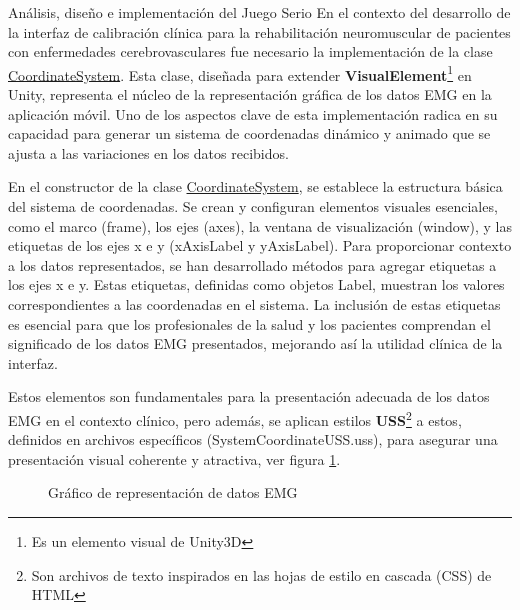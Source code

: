 \begin{thesischapter}{2} {Análisis, diseño e implementación del Juego Serio}
    En el contexto del desarrollo de la interfaz de calibración clínica para la rehabilitación neuromuscular de pacientes con enfermedades cerebrovasculares
    fue necesario la implementación de la clase \underline{CoordinateSystem}. Esta clase, diseñada para extender \textbf{VisualElement}\footnote{Es un elemento visual de Unity3D } en Unity, representa el núcleo de la representación 
    gráfica de los datos EMG en la aplicación móvil. Uno de los aspectos clave de esta implementación 
    radica en su capacidad para generar un sistema de coordenadas dinámico y animado que se ajusta a las variaciones en los datos recibidos.

    \vspace{10pt}
    En el constructor de la clase \underline{CoordinateSystem}, se establece la estructura básica del sistema de coordenadas. Se crean y configuran elementos visuales esenciales, como el 
    marco (frame), los ejes (axes), la ventana de visualización (window), y las etiquetas de los ejes x e y (xAxisLabel y yAxisLabel). Para proporcionar contexto a los datos 
    representados, se han desarrollado métodos para agregar etiquetas a los ejes x e y. Estas etiquetas, definidas como objetos Label, muestran los 
    valores correspondientes a las coordenadas en el sistema. La inclusión de estas etiquetas es esencial para que los profesionales de la salud y los pacientes 
    comprendan el significado de los datos EMG presentados, mejorando así la utilidad clínica de la interfaz. 
    
    \vspace{5pt}
    Estos elementos son fundamentales para la presentación adecuada de los datos EMG en el contexto clínico, pero además, se aplican estilos \textbf{USS}\footnote{Son archivos de texto inspirados en las hojas de estilo en cascada (CSS) de HTML} a estos, definidos en archivos específicos (SystemCoordinateUSS.uss), para asegurar una 
    presentación visual coherente y atractiva, ver figura \ref{fig: graph-emg}.

    \begin{figure}[ht]
        \centering
        \caption{Gráfico de representación de datos EMG}
        \label{fig: graph-emg}
    \end{figure}


\end{thesischapter}
